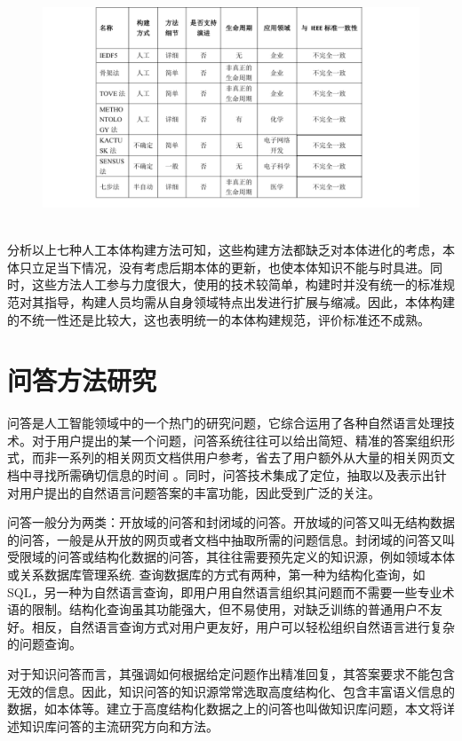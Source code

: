 \begin{figure}[!htb]
	\centering\includegraphics[height=7cm]{resource/onto_method_compare}
	\label{fig:onto_method_compare}
\end{figure}

分析以上七种人工本体构建方法可知，这些构建方法都缺乏对本体进化的考虑，本体只立足当下情况，没有考虑后期本体的更新，也使本体知识不能与时具进。同时，这些方法人工参与力度很大，使用的技术较简单，构建时并没有统一的标准规范对其指导，构建人员均需从自身领域特点出发进行扩展与缩减。因此，本体构建的不统一性还是比较大，这也表明统一的本体构建规范，评价标准还不成熟。

\section{问答方法研究}
问答是人工智能领域中的一个热门的研究问题，它综合运用了各种自然语言处理技术。对于用户提出的某一个问题，问答系统往往可以给出简短、精准的答案组织形式，而非一系列的相关网页文档供用户参考，省去了用户额外从大量的相关网页文档中寻找所需确切信息的时间\cite{Lu} \cite{Bertola}。同时，问答技术集成了定位，抽取以及表示出针对用户提出的自然语言问题答案的丰富功能，因此受到广泛的关注\cite{Abacha}\cite{Pavli}。

问答一般分为两类：开放域的问答和封闭域的问答。开放域的问答又叫无结构数据的问答，一般是从开放的网页或者文档中抽取所需的问题信息。封闭域的问答又叫受限域的问答或结构化数据的问答，其往往需要预先定义的知识源，例如领域本体或关系数据库管理系统\cite{Dalmas}\cite{Dragoni}. 查询数据库的方式有两种，第一种为结构化查询，如SQL，另一种为自然语言查询，即用户用自然语言组织其问题而不需要一些专业术语的限制\cite{Jagadish}。结构化查询虽其功能强大，但不易使用，对缺乏训练的普通用户不友好。相反，自然语言查询方式对用户更友好，用户可以轻松组织自然语言进行复杂的问题查询。

对于知识问答而言，其强调如何根据给定问题作出精准回复，其答案要求不能包含无效的信息。因此，知识问答的知识源常常选取高度结构化、包含丰富语义信息的数据，如本体等。建立于高度结构化数据之上的问答也叫做知识库问题，本文将详述知识库问答的主流研究方向和方法。

